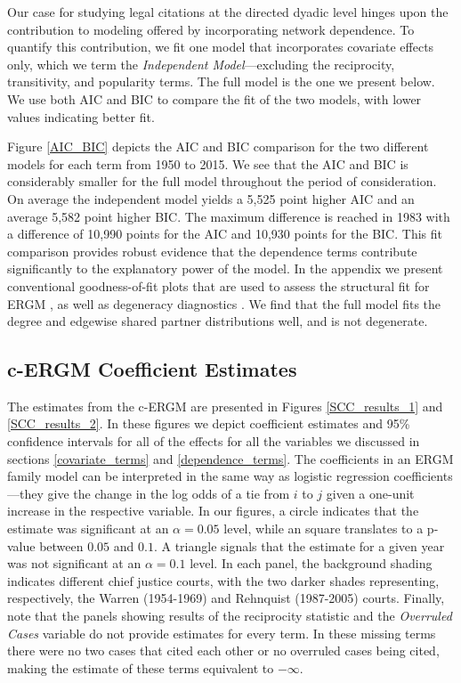 \documentclass{cup-pan}
\begin{document}
Our case for studying legal citations at the directed dyadic level hinges upon the contribution to modeling offered by incorporating network dependence. To quantify this contribution, we fit one model that incorporates covariate effects only, which we term the {\em Independent Model}---excluding the reciprocity, transitivity, and popularity terms. The full model is the one we present below. We use both AIC and BIC to compare the fit of the two models, with lower values indicating better fit.  


Figure \ref{AIC_BIC} depicts the AIC and BIC comparison for the two different models for each term from 1950 to 2015. We see that the AIC and BIC is considerably smaller for the full model throughout the period of consideration. On average the independent model yields a 5,525 point higher AIC and an average 5,582 point higher BIC. The maximum difference is reached in 1983 with a difference of 10,990 points for the AIC and 10,930 points for the BIC. This fit comparison provides robust evidence that the dependence terms contribute significantly to the explanatory power of the model. In the appendix we present conventional goodness-of-fit plots that are used to assess the structural fit for ERGM \citep{hunter2008goodness}, as well as degeneracy diagnostics \citep{mukherjee2020degeneracy}. We find that the full model fits the degree and edgewise shared partner distributions well, and is not degenerate.
  
\subsection{c-ERGM Coefficient Estimates}
The estimates from the c-ERGM are presented in Figures \ref{SCC_results_1} and \ref{SCC_results_2}. In these figures we depict coefficient estimates and 95\% confidence intervals for all of the effects for all the variables we discussed in sections \ref{covariate_terms} and \ref{dependence_terms}. The coefficients in an ERGM family model can be interpreted in the same way as logistic regression coefficients---they give the change in the log odds of a tie from $i$ to $j$ given a one-unit increase in the respective variable. In our figures, a circle indicates that the estimate was significant at an $\alpha=0.05$ level, while an square translates to a p-value between $0.05$ and $0.1$. A triangle signals that the estimate for a given year was not significant at an $\alpha=0.1$ level. In each panel, the background shading indicates different chief justice courts, with the two darker shades representing, respectively, the Warren (1954-1969) and Rehnquist (1987-2005) courts. Finally, note that the panels showing results of the reciprocity statistic and the \textit{Overruled Cases} variable do not provide estimates for every term. In these missing terms there were no two cases that cited each other or no overruled cases being cited, making the estimate of these terms equivalent to $-\infty$. %
\end{document}
